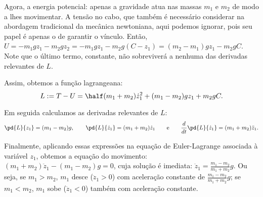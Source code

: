 \begin{question}
\begin{solution}
      Agora, a energia potencial: apenas a gravidade atua nas massas $m_1$ e $m_2$ de modo a lhes movimentar.
      A tensão no cabo, que também é necessário considerar na abordagem tradicional da mecânica newtoniana, aqui podemos ignorar, pois seu papel é apenas o de garantir o vínculo.
      Então, $U = -m_1gz_1 - m_2gz_2 = -m_1gz_1 - m_2g(C-z_1) = (m_2 - m_1)gz_1 - m_2gC$.
      Note que o último termo, constante, não sobreviverá a nenhuma das derivadas relevantes de $L$.

      Assim, obtemos a função lagrangeana:
      \begin{equation*}
        L := T - U = \half (m_1 + m_2) \dot z_1^2 + (m_1 - m_2)gz_1 + m_2gC.
      \end{equation*}

      Em seguida calculamos as derivadas relevantes de $L$:
      \begin{equation*}
        \pd{L}{z_1} = (m_1 - m_2) g,
        \qquad
        \pd{L}{\dot z_1} = (m_1 + m_2)\dot z_1
        \qquad\text{e}\qquad
        \frac{d}{dt}\pd{L}{\dot z_1} = (m_1 + m_2)\ddot z_1.
      \end{equation*}

      Finalmente, aplicando essas expressões na equação de Euler-Lagrange associada à variável $z_1$, obtemos a equação do movimento: $(m_1 + m_2) \ddot z_1 - (m_1 - m_2)g = 0$, cuja solução é imediata: $\ddot z_1 = \frac{m_1 - m_2}{m_1 + m_2}g$.
      Ou seja, se $m_1 > m_2$, $m_1$ desce ($\ddot z_1 > 0$) com aceleração constante de $\frac{m_1 - m_2}{m_1 + m_2}g$; se $m_1 < m_2$, $m_1$ sobe ($\ddot z_1 < 0$) também com aceleração constante.
    \end{solution}
\end{question}